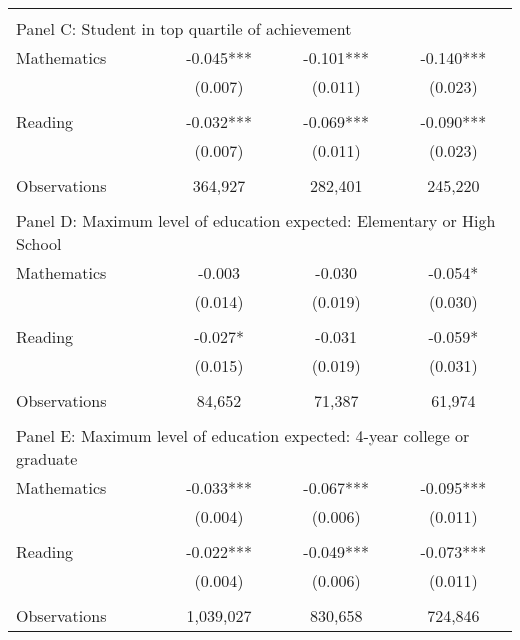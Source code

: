 {\begin{tabular}{lccc}
&  &  &   \\
\multicolumn{4}{l}{Panel C: Student in top quartile of achievement} \\
Mathematics         &      -0.045***&      -0.101***&      -0.140***\\
                    &     (0.007)   &     (0.011)   &     (0.023)   \\
 
&  &  &   \\
Reading             &      -0.032***&      -0.069***&      -0.090***\\
                    &     (0.007)   &     (0.011)   &     (0.023)   \\
                    &               &               &               \\
Observations        &     364,927   &     282,401   &     245,220   \\
 
&  &  &   \\
\multicolumn{4}{l}{Panel D: Maximum level of education expected: Elementary or High School} \\
Mathematics         &      -0.003   &      -0.030   &      -0.054*  \\
                    &     (0.014)   &     (0.019)   &     (0.030)   \\
 
&  &  &   \\
Reading             &      -0.027*  &      -0.031   &      -0.059*  \\
                    &     (0.015)   &     (0.019)   &     (0.031)   \\
                    &               &               &               \\
Observations        &      84,652   &      71,387   &      61,974   \\
 
&  &  &   \\
\multicolumn{4}{l}{Panel E: Maximum level of education expected: 4-year college or graduate} \\
Mathematics         &      -0.033***&      -0.067***&      -0.095***\\
                    &     (0.004)   &     (0.006)   &     (0.011)   \\
 
&  &  &   \\
Reading             &      -0.022***&      -0.049***&      -0.073***\\
                    &     (0.004)   &     (0.006)   &     (0.011)   \\
                    &               &               &               \\
Observations        &   1,039,027   &     830,658   &     724,846   \\
 

\bottomrule
\end{tabular}
}
